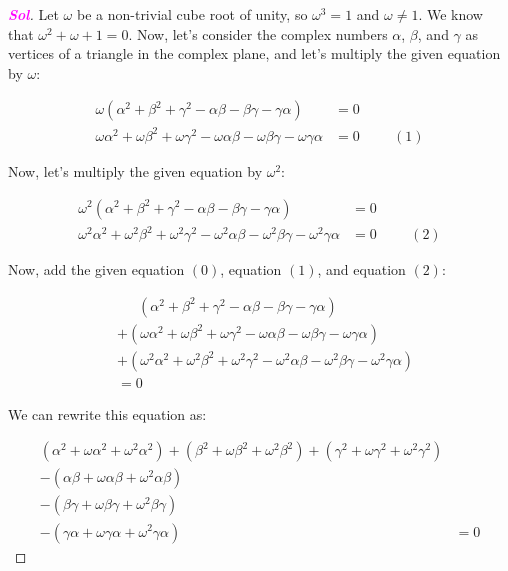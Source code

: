 \documentclass{article}
\theoremstyle{definition}
\newcommand{\sol}{\textcolor{magenta}{\bf Sol}}
\begin{document}
\begin{enumerate}
\begin{proof}[\sol]
	\newpage
	Let $\omega$ be a non-trivial cube root of unity, so $\omega^3 = 1$ and $\omega \neq 1$. We know that $\omega^2 + \omega + 1 = 0$. Now, let's consider the complex numbers $\alpha$, $\beta$, and $\gamma$ as vertices of a triangle in the complex plane, and let's multiply the given equation by $\omega$:

	\begin{align*}
	\omega(\alpha^2+\beta^2+\gamma^2-\alpha\beta-\beta\gamma-\gamma\alpha) &= 0 \\
	\omega\alpha^2 + \omega\beta^2 + \omega\gamma^2 - \omega\alpha\beta - \omega\beta\gamma - \omega\gamma\alpha &= 0 \hspace{1cm} (1)
	\end{align*}

	Now, let's multiply the given equation by $\omega^2$:

	\begin{align*}
	\omega^2(\alpha^2+\beta^2+\gamma^2-\alpha\beta-\beta\gamma-\gamma\alpha) &= 0 \\
	\omega^2\alpha^2 + \omega^2\beta^2 + \omega^2\gamma^2 - \omega^2\alpha\beta - \omega^2\beta\gamma - \omega^2\gamma\alpha &= 0 \hspace{1cm} (2)
	\end{align*}

	Now, add the given equation $(0)$, equation $(1)$, and equation $(2)$:

	\begin{align*}
	&\phantom{{}={}}\, (\alpha^2+\beta^2+\gamma^2-\alpha\beta-\beta\gamma-\gamma\alpha) \\
	&+ (\omega\alpha^2 + \omega\beta^2 + \omega\gamma^2 - \omega\alpha\beta - \omega\beta\gamma - \omega\gamma\alpha) \\
	&+ (\omega^2\alpha^2 + \omega^2\beta^2 + \omega^2\gamma^2 - \omega^2\alpha\beta - \omega^2\beta\gamma - \omega^2\gamma\alpha) \\
	&= 0
	\end{align*}

	We can rewrite this equation as:

	\begin{align*}
	(\alpha^2 + \omega\alpha^2 + \omega^2\alpha^2) + (\beta^2 + \omega\beta^2 + \omega^2\beta^2) + (\gamma^2 + \omega\gamma^2 + \omega^2\gamma^2) \\
	- (\alpha\beta + \omega\alpha\beta + \omega^2\alpha\beta) \\
	- (\beta\gamma + \omega\beta\gamma + \omega^2\beta\gamma) \\
	- (\gamma\alpha + \omega\gamma\alpha + \omega^2\gamma\alpha) &= 0
	\end{align*}


\end{proof}
\end{enumerate}
\end{document}
